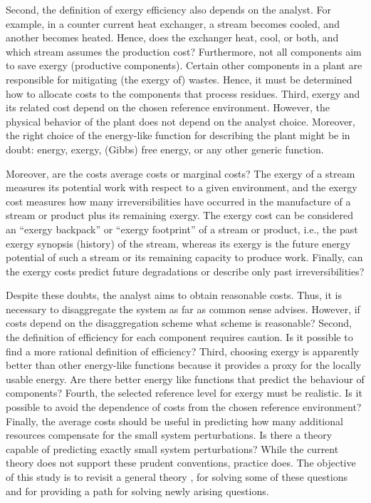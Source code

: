 \documentclass[energies,article,submit,moreauthors,pdftex]{Definitions/mdpi}
\begin{document}
Second, the definition of exergy efficiency also depends on the analyst. For example, in a counter current heat exchanger, a stream becomes cooled, and another becomes heated. Hence, does the exchanger heat, cool, or both, and which stream assumes the production cost? Furthermore, not all components aim to save exergy (productive components). Certain other components in a plant are responsible for mitigating (the exergy of) wastes. Hence, it must be determined how to allocate costs to the components that process residues.
Third, exergy and its related cost depend on the chosen reference environment. However, the physical behavior of the plant does not depend on the analyst choice. Moreover, the right choice of the energy-like function for describing the plant might be in doubt: energy, exergy, (Gibbs) free energy, or any other generic function.

Moreover, are the costs average costs or marginal costs? The exergy of a stream measures its potential work with respect to a given environment, and the exergy cost measures how many irreversibilities have occurred in the manufacture of a stream or product plus its remaining exergy. The exergy cost can be considered an “exergy backpack” or “exergy footprint” of a stream or product, i.e., the past exergy synopsis (history) of the stream, whereas its exergy is the future energy potential of such a stream or its remaining capacity to produce work. Finally, can the exergy costs predict future degradations or describe only past irreversibilities?

Despite these doubts, the analyst aims to obtain reasonable costs. Thus, it is necessary to disaggregate the system as far as common sense advises. However, if costs depend on the disaggregation scheme what scheme is reasonable? Second, the definition of efficiency for each component requires caution. Is it possible to find a more rational definition of efficiency? Third, choosing exergy is apparently better than other energy-like functions because it provides a proxy for the locally usable energy. Are there better energy like functions that predict the behaviour of components? Fourth, the selected reference level for exergy must be realistic. Is it possible to avoid the dependence of costs from the chosen reference environment? Finally, the average costs should be useful in predicting how many additional resources compensate for the small system perturbations. Is there a theory capable of predicting  exactly small system perturbations? While the current theory does not support these prudent conventions, practice does. The objective of this study is to revisit a general theory \cite{Valero1992a,Valero1992b}, for solving some of these questions and for providing a path for solving newly arising questions.
\end{document}
